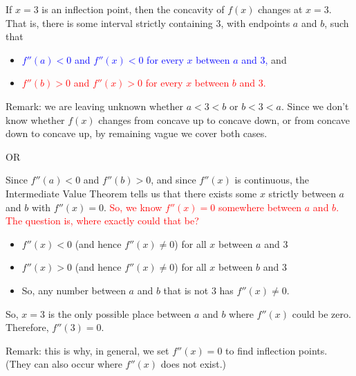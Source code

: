 \begin{solution}
If $x=3$ is an inflection point, then the concavity of $f(x)$ changes at $x=3$. That is, there is some interval strictly containing 3, with endpoints $a$ and $b$, such that
\begin{itemize}
\item \textcolor{blue}{$f''(a)<0$ and $f''(x)<0$ for every $x$ between $a$ and 3,} and
\item \textcolor{red}{$f''(b)>0$ and $f''(x)>0$ for every $x$ between $b$ and 3.}
\end{itemize}
Remark: we are leaving unknown whether $a<3<b$ or $b<3<a$. Since we don't know whether $f(x)$ changes from concave up to concave down, or from concave down to concave up, by remaining vague we cover both cases.
\vspace{5mm}
\begin{center}

OR
\vspace{5mm}

\end{center}

Since $f''(a)<0$ and $f''(b)>0$, and since $f''(x)$ is continuous, the Intermediate Value Theorem tells us that there exists some $x$ strictly between $a$ and $b$ with $f''(x)=0$. \textcolor{red}{So, we know $f''(x)=0$ somewhere between $a$ and $b$. The question is, where exactly could that be?}


\begin{itemize}
\item $f''(x)<0$ (and hence $f''(x) \neq 0$) for all $x$ between $a$ and 3
\item $f''(x)>0$ (and hence $f''(x) \neq 0$)  for all $x$ between $b$ and 3
\item So, any number between $a$ and $b$ that is not 3 has $f''(x)\neq 0$.
\end{itemize}So, $x=3$ is the only possible place between $a$ and $b$ where $f''(x)$ could be zero. Therefore, $f''(3)=0$.

Remark: this is why, in general, we set $f''(x)=0$ to find inflection points. (They can also occur where $f''(x)$ does not exist.)
\end{solution}
